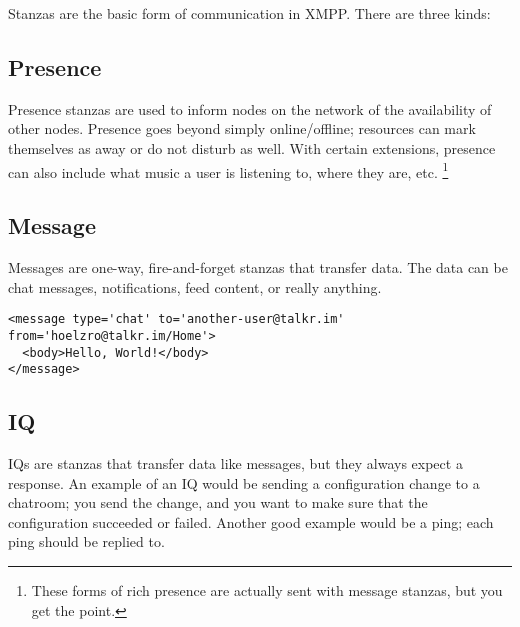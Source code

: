 Stanzas are the basic form of communication in XMPP.  There are three kinds:

\pause
\subsection*{Presence}

Presence stanzas are used to inform nodes on the network of the availability of
other nodes.  Presence goes beyond simply online/offline; resources can mark themselves
as away or do not disturb as well.  With certain extensions, presence can also include
what music a user is listening to, where they are, etc.
\footnote{These forms of rich presence are actually sent with message stanzas, but you get the point.}

\pause
\subsection*{Message}

Messages are one-way, fire-and-forget stanzas that transfer data.  The data can be chat messages, notifications,
feed content, or really anything.

\begin{verbatim}
<message type='chat' to='another-user@talkr.im' from='hoelzro@talkr.im/Home'>
  <body>Hello, World!</body>
</message>
\end{verbatim}

\pause
\subsection*{IQ}

IQs are stanzas that transfer data like messages, but they always expect a response.  An example of an IQ would be
sending a configuration change to a chatroom; you send the change, and you want to make sure that the configuration
succeeded or failed.  Another good example would be a ping; each ping should be replied to.
